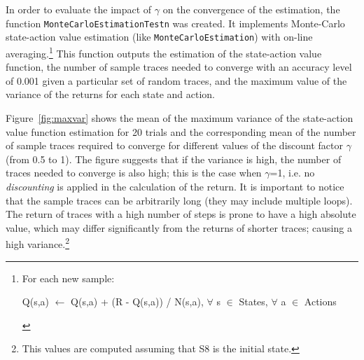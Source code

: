 \documentclass[10pt]{article}   	%
\begin{document}
In order to evaluate the impact of $\gamma$ on the convergence of the estimation, the function \texttt{MonteCarloEstimationTestn} was created. It implements Monte-Carlo state-action value estimation (like \texttt{MonteCarloEstimation}) with on-line averaging.\footnote{ For each new sample: \begin{algorithmic}
  \STATE Q(s,a) $\leftarrow$ Q(s,a) + (R - Q(s,a)) / N(s,a), $\forall$ s $\in$ States, $\forall$ a $\in$ Actions\;
\end{algorithmic}} This function outputs the estimation of the state-action value function, the number of sample traces needed to converge with an accuracy level of 0.001 given a particular set of random traces, and the maximum value of the variance of the returns for each state and action. 

Figure~\ref{fig:maxvar} shows the mean of the maximum variance of the state-action value function estimation for 20 trials and the corresponding mean of the number of sample traces required to converge for different values of the discount factor $\gamma$ (from 0.5 to 1). The figure suggests that if the variance is high, the number of traces needed to converge is also high; this is the case when $\gamma$=1, i.e. no \textit{discounting} is applied in the calculation of the return. It is important to notice that the sample traces can be arbitrarily long (they may include multiple loops). The return of traces with a high number of steps is prone to have a high absolute value, which may differ significantly from the returns of shorter traces; causing a high variance.\footnote{This values are computed assuming that S8 is the initial state.}
\end{document}
